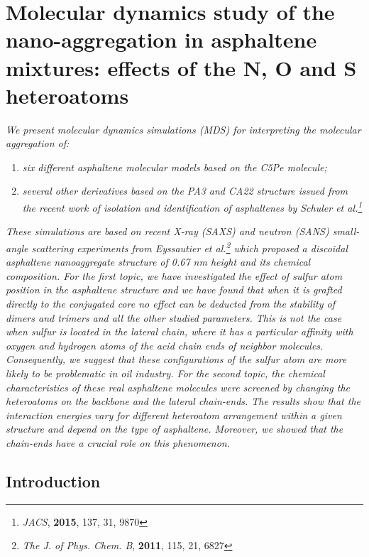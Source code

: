\singlespacing
\chapter[Molecular dynamics study of the nano-aggregation in asphaltene]{Molecular dynamics study of the nano-aggregation in asphaltene mixtures: effects of the N, O and S heteroatoms}
\minitoc
\restoregeometry

\newpage


\textit{We present molecular dynamics simulations (MDS) for interpreting the molecular aggregation of:}
\begin{enumerate}
	\item \textit{six different asphaltene molecular models based on the C5Pe molecule;}
	\item \textit{several other derivatives based on the PA3 and CA22 structure issued from the recent work of isolation and identification of asphaltenes by Schuler \textit{et al.}\footnote{\textit{JACS}, \textbf{2015}, 137, 31, 9870}}
\end{enumerate}    

\textit{These simulations are based on recent X-ray (SAXS) and neutron (SANS) small-angle scattering experiments from Eyssautier \textit{et al.}\footnote{\textit{The J. of Phys. Chem. B}, \textbf{2011}, 115, 21, 6827} which proposed a discoidal asphaltene nanoaggregate structure of 0.67 nm height and its chemical composition. For the first topic, we have investigated the effect of sulfur atom position in the asphaltene structure and we have found that when it is grafted directly to the conjugated core no effect can be deducted from the stability of dimers and trimers and all the other studied parameters. This is not the case when sulfur is located in the lateral chain, where it has a particular affinity with oxygen and hydrogen atoms of the acid chain ends of neighbor molecules. Consequently, we suggest that these configurations of the sulfur atom are more likely to be problematic in oil industry. For the second topic, the chemical characteristics of these real asphaltene molecules were screened by changing the heteroatoms on the backbone and the lateral chain-ends. The results show that the interaction energies vary for different heteroatom arrangement within a given structure and depend on the type of asphaltene. Moreover, we showed that the chain-ends have a crucial role on this phenomenon.}

\clearpage

\section{Introduction}

